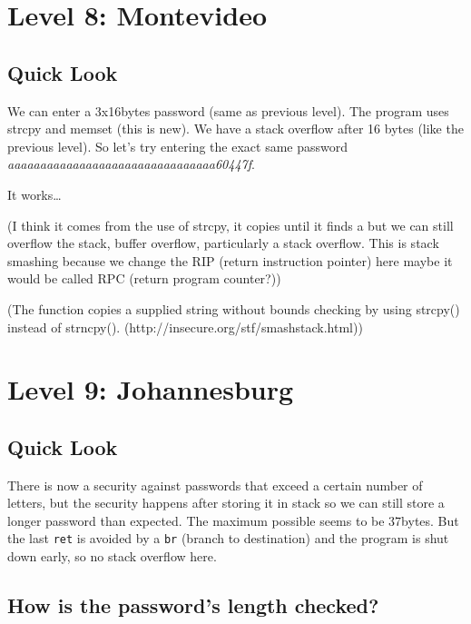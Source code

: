 \documentclass[a4paper,11pt]{article}
\begin{document}
\section{Level 8: Montevideo}\label{level-8-montevideo}

\subsection{Quick Look}\label{quick-look-2}

We can enter a 3x16bytes password (same as previous level). The program
uses strcpy and memset (this is new). We have a stack overflow after 16
bytes (like the previous level). So let's try entering the exact same
password \emph{aaaaaaaaaaaaaaaaaaaaaaaaaaaaaaaa60447f}.

It works\ldots{}

(I think it comes from the use of strcpy, it copies until it finds a \0
but we can still overflow the stack, buffer overflow, particularly a
stack overflow. This is stack smashing because we change the RIP (return
instruction pointer) here maybe it would be called RPC (return program
counter?))

(The function copies a supplied string without bounds checking by using
strcpy() instead of strncpy().
(http://insecure.org/stf/smashstack.html))

\section{Level 9: Johannesburg}\label{level-9-johannesburg}

\subsection{Quick Look}\label{quick-look-3}

There is now a security against passwords that exceed a certain number
of letters, but the security happens after storing it in stack so we can
still store a longer password than expected. The maximum possible seems
to be 37bytes. But the last \texttt{ret} is avoided by a \texttt{br}
(branch to destination) and the program is shut down early, so no stack
overflow here.

\subsection{How is the password's length
checked?}\label{how-is-the-passwords-length-checked}
\end{document}
